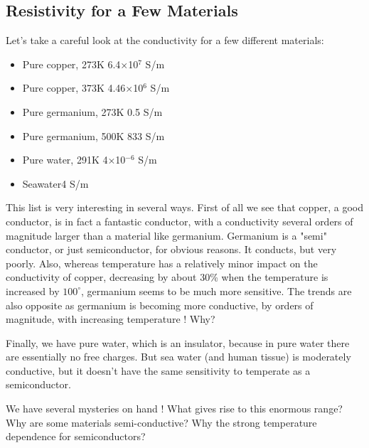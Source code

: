\subsection{Resistivity for a Few Materials}
Let's take a careful look at the conductivity for a few different materials:
\vspace{.5cm}
\begin{minipage}[c]{.55\textwidth}
\begin{itemize}
\item  Pure copper, 273K \hfill 6.4×10$^{7}$ S/m
\item Pure copper, 373K \hfill 4.46×10$^{6}$ S/m
\item Pure germanium, 273K \hfill 0.5  S/m
\item Pure germanium, 500K \hfill 833 S/m
\item Pure water, 291K \hfill 4×10$^{-6}$ S/m
\item Seawater\hfill 4 S/m
\end{itemize} 
\end{minipage}
\vspace{.5cm}
This list is very interesting in several ways.  First of all we see that copper, a good conductor, is in fact a fantastic conductor, with a conductivity several orders of magnitude larger than a material like germanium.  Germanium is a "semi" conductor, or just semiconductor, for obvious reasons.  It conducts, but very poorly.  Also, whereas temperature has a relatively minor impact on the conductivity of copper, decreasing by about 30\% when the temperature is increased by $100^\circ$, germanium seems to be much more sensitive.  The trends are also opposite as germanium is becoming more conductive, by orders of magnitude, with increasing temperature !  Why?

Finally, we have pure water, which is an insulator, because in pure water there are essentially no free charges.  But sea water (and human tissue) is moderately conductive, but it doesn't have the same sensitivity to temperate as a semiconductor.

We have several mysteries on hand !
What gives rise to this enormous range?
Why are some materials semi-conductive?
Why the strong temperature dependence for semiconductors?

